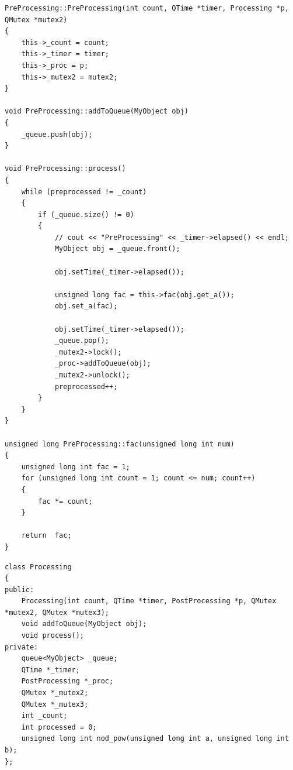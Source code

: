 \documentclass[a4paper,14pt]{report}
\begin{document}
\begin{lstlisting}[label=some-code,caption=Реализация класса PreProcessing]
PreProcessing::PreProcessing(int count, QTime *timer, Processing *p, QMutex *mutex2)
{
    this->_count = count;
    this->_timer = timer;
    this->_proc = p;
    this->_mutex2 = mutex2;
}

void PreProcessing::addToQueue(MyObject obj)
{
    _queue.push(obj);
}

void PreProcessing::process()
{
    while (preprocessed != _count)
    {
        if (_queue.size() != 0)
        {
            // cout << "PreProcessing" << _timer->elapsed() << endl;
            MyObject obj = _queue.front();

            obj.setTime(_timer->elapsed());

            unsigned long fac = this->fac(obj.get_a());
            obj.set_a(fac);

            obj.setTime(_timer->elapsed());
            _queue.pop();
            _mutex2->lock();
            _proc->addToQueue(obj);
            _mutex2->unlock();
            preprocessed++;
        }
    }
}

unsigned long PreProcessing::fac(unsigned long int num)
{
    unsigned long int fac = 1;
    for (unsigned long int count = 1; count <= num; count++)
    {
        fac *= count;
    }

    return  fac;
}
\end{lstlisting}

\begin{lstlisting}[label=some-code,caption=Объявление класса Processing]
class Processing
{
public:
    Processing(int count, QTime *timer, PostProcessing *p, QMutex *mutex2, QMutex *mutex3);
    void addToQueue(MyObject obj);
    void process();
private:
    queue<MyObject> _queue;
    QTime *_timer;
    PostProcessing *_proc;
    QMutex *_mutex2;
    QMutex *_mutex3;
    int _count;
    int processed = 0;
    unsigned long int nod_pow(unsigned long int a, unsigned long int b);
};
\end{lstlisting}
\end{document}
